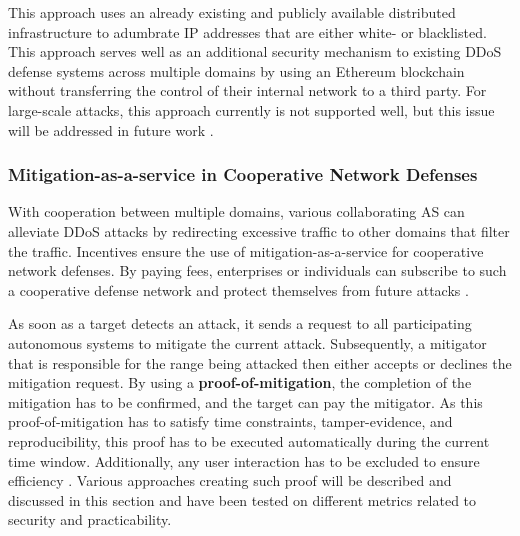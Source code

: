 This approach uses an already existing and publicly available distributed infrastructure to adumbrate IP addresses that are either white- or blacklisted. This approach serves well as an additional security mechanism to existing DDoS defense systems across multiple domains by using an Ethereum blockchain without transferring the control of their internal network to a third party. For large-scale attacks, this approach currently is not supported well, but this issue will be addressed in future work \cite{Rodrigues2017}.


\subsubsection{Mitigation-as-a-service in Cooperative Network Defenses}

With cooperation between multiple domains, various collaborating AS can alleviate DDoS attacks by redirecting excessive traffic to other domains that filter the traffic. Incentives ensure the use of mitigation-as-a-service for cooperative network defenses. By paying fees, enterprises or individuals can subscribe to such a cooperative defense network and protect themselves from future attacks \cite{Mannhart2018}.

As soon as a target detects an attack, it sends a request to all participating autonomous systems to mitigate the current attack. Subsequently, a mitigator that is responsible for the range being attacked then either accepts or declines the mitigation request. By using a \textbf{proof-of-mitigation}, the completion of the mitigation has to be confirmed, and the target can pay the mitigator. As this proof-of-mitigation has to satisfy time constraints, tamper-evidence, and reproducibility, this proof has to be executed automatically during the current time window. Additionally, any user interaction has to be excluded to ensure efficiency \cite{Mannhart2018}. Various approaches creating such proof will be described and discussed in this section and have been tested on different metrics related to security and practicability.

